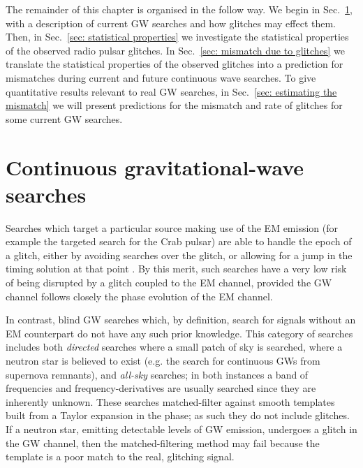 \documentclass[../full_thesis/full_thesis.tex]{subfiles}
\begin{document}

The remainder of this chapter is organised in the follow way. We begin in
Sec.~\ref{sec: continuous gravitational-wave searches}, with a description of
current GW searches and how glitches may effect them. Then, in Sec.~\ref{sec:
statistical properties} we investigate the statistical properties of the
observed radio pulsar glitches. In Sec.~\ref{sec: mismatch due to glitches} we
translate the statistical properties of the observed glitches into a prediction
for mismatches during current and future continuous wave searches. To give
quantitative results relevant to real GW searches, in Sec.~\ref{sec: estimating
the mismatch} we will present predictions for the mismatch and rate of glitches for
some current GW searches.

\section{Continuous gravitational-wave searches}
\label{sec: continuous gravitational-wave searches}

Searches which target a particular source making use of the EM emission (for
example the \citet{ligo2010} targeted search for the Crab pulsar) are able to
handle the epoch of a glitch, either by avoiding searches over the glitch, or
allowing for a jump in the timing solution at that point \citep{ligo2010}. By
this merit, such searches have a very low risk of being disrupted by a glitch
coupled to the EM channel, provided the GW channel follows closely the phase
evolution of the EM channel.

In contrast, blind GW searches which, by definition, search for signals without an
EM counterpart do not have any such prior knowledge. This category of searches
includes both \emph{directed} searches where a small patch of sky is searched,
where a neutron star is believed to exist (e.g. the \citet{ligo_SNR2015} search
for continuous GWs from supernova remnants), and \emph{all-sky} searches; in
both instances a band of frequencies and frequency-derivatives are usually
searched since they are inherently unknown. These searches
matched-filter against smooth templates built from a Taylor expansion in
the phase; as such they do not include glitches. If a neutron star, emitting
detectable levels of GW emission, undergoes a glitch in the GW channel, then the
matched-filtering method may fail because the template is a poor match to the
real, glitching signal.
\end{document}
